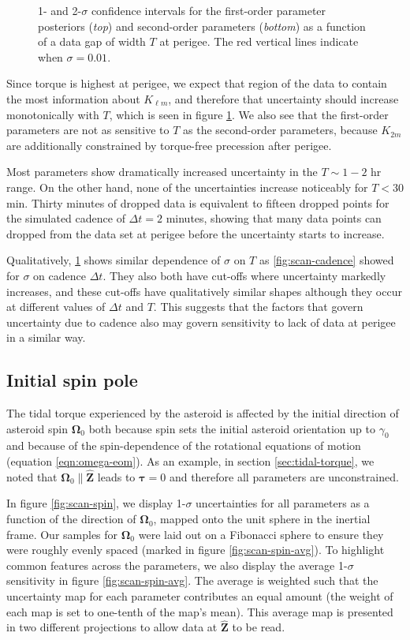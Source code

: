 \documentclass[fleqn,usenatbib]{mnras}
\newcommand{\unit}[1]{\bm{\hat{#1}}}
\begin{document}
\begin{figure}
  \caption{1- and 2-$\sigma$ confidence intervals for the first-order parameter posteriors (\textit{top}) and second-order parameters (\textit{bottom}) as a function of a data gap of width $T$ at perigee. The red vertical lines indicate when $\sigma = 0.01$.}
  \label{fig:observation-gap}
\end{figure}

Since torque is highest at perigee, we expect that region of the data to contain the most information about $K_{\ell m}$, and therefore that uncertainty should increase monotonically with $T$, which is seen in figure \ref{fig:observation-gap}. We also see that the first-order parameters are not as sensitive to $T$ as the second-order parameters, because $K_{2m}$ are additionally constrained by torque-free precession after perigee.

Most parameters show dramatically increased uncertainty in the $T \sim 1-2$ hr range. On the other hand, none of the uncertainties increase noticeably for $T < 30$ min. Thirty minutes of dropped data is equivalent to fifteen dropped points for the simulated cadence of $\Delta t = 2$ minutes, showing that many data points can dropped from the data set at perigee before the uncertainty starts to increase.

Qualitatively, \ref{fig:observation-gap} shows similar dependence of $\sigma$ on $T$ as \ref{fig:scan-cadence} showed for $\sigma$ on cadence $\Delta t$. They also both have cut-offs where uncertainty markedly increases, and these cut-offs have qualitatively similar shapes although they occur at different values of $\Delta t$ and $T$. This suggests that the factors that govern uncertainty due to cadence also may govern sensitivity to lack of data at perigee in a similar way.


\subsection{Initial spin pole}
\label{sec:scan-spin}

The tidal torque experienced by the asteroid is affected by the initial direction of asteroid spin $\bm \Omega_0$ both because spin sets the initial asteroid orientation up to $\gamma_0$ and because of the spin-dependence of the rotational equations of motion (equation \ref{eqn:omega-eom}). As an example, in section \ref{sec:tidal-torque}, we noted that $\bm \Omega_0 \parallel \unit Z$ leads to $\bm \tau = 0$ and therefore all parameters are unconstrained.

In figure \ref{fig:scan-spin}, we display 1-$\sigma$ uncertainties for all parameters as a function of the direction of $\bm \Omega_0$, mapped onto the unit sphere in the inertial frame. Our samples for $\bm \Omega_0$ were laid out on a Fibonacci sphere to ensure they were roughly evenly spaced (marked in figure \ref{fig:scan-spin-avg}). To highlight common features across the parameters, we also display the average 1-$\sigma$ sensitivity in figure \ref{fig:scan-spin-avg}. The average is weighted such that the uncertainty map for each parameter contributes an equal amount
(the weight of each map is set to one-tenth of the map's mean). This average map is presented in two different projections to allow data at $\unit Z$ to be read.
\end{document}

